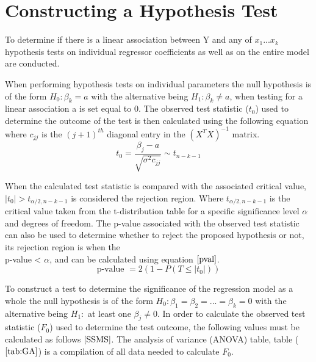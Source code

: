 \documentclass[12pt]{report}
\begin{document}
\section{Constructing a Hypothesis Test}
To determine if there is a linear association between Y and any of $x_{1} ... x_{k}$ hypothesis tests on individual regressor coefficients as well as on the entire model are conducted. 

When performing hypothesis tests on individual parameters the null hypothesis is of the form $H_{0}: \beta_{k} = a$ with the alternative being $H_{1}: \beta_{k} \neq a$, when testing for a linear association a is set equal to 0. The observed test statistic ($t_{0}$) used to determine the outcome of the test is then calculated using the following equation where $c_{jj}$ is the $(j+1)^{th}$ diagonal entry in the $(X^{T}X)^{-1}$ matrix.
\begin{equation}
    t_{0} = \frac{\beta_{j} - a}{\sqrt{\sigma^{2}c_{jj}}} \sim t_{n-k-1}
\end{equation}

When the calculated test statistic is compared with the associated critical value, \\$|t_{0}| > t_{\alpha/2, n-k-1}$ is considered the rejection region. Where $t_{\alpha/2, n-k-1}$ is the critical value taken from the t-distribution table for a specific significance level $\alpha$ and degrees of freedom. The p-value associated with the observed test statistic can also be used to determine whether to reject the proposed hypothesis or not, its rejection region is when the \\ p-value < $\alpha$, and can be calculated using equation $\eqref{pval}$.
\begin{equation} \label{pval}
    \text{p-value } = 2(1 - P(T \leq |t_{0}|))
\end{equation}

To construct a test to determine the significance of the regression model as a whole the null hypothesis is of the form $H_{0}: \beta_{1} = \beta_{2} = ... = \beta_{k} = 0$ with the alternative being $H_{1}:$ at least one $\beta_{j} \neq 0$. In order to calculate the observed test statistic ($F_{0}$) used to determine the test outcome, the following values must be calculated as follows $\eqref{SSMS}$. The analysis of variance (ANOVA) table, table ($\ref{tab:GA}$) is a compilation of all data needed to calculate $F_{0}$.  
\end{document}
